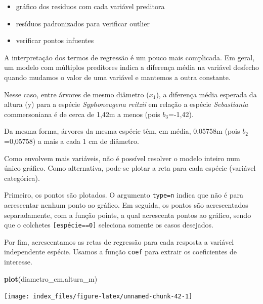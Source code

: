\documentclass[12pt,brazil,oneside]{book}
\newenvironment{Shaded}{\begin{snugshade}}{\end{snugshade}}
\newcommand{\KeywordTok}[1]{\textcolor[rgb]{0.13,0.29,0.53}{\textbf{#1}}}
\newcommand{\NormalTok}[1]{#1}
\providecommand{\tightlist}{%
  \setlength{\itemsep}{0pt}\setlength{\parskip}{0pt}}
\begin{document}
\begin{itemize}
\tightlist
\item
  gráfico dos resíduos com cada variável preditora
\item
  resíduos padronizados para verificar outlier
\item
  verificar pontos infuentes
\end{itemize}

A interpretação dos termos de regressão é um pouco mais complicada. Em geral, um modelo com múltiplos preditores indica a diferença média na variável desfecho quando mudamos o valor de uma variável e mantemos a outra constante.

Nesse caso, entre árvores de mesmo diâmetro (\(x_1\)), a diferença média esperada da altura (y) para a espécie \emph{Syphoneugena reitzii} em relação a espécie \emph{Sebastiania} commersoniana é de cerca de 1,42m a menos (pois \(b_3\)=-1,42).

Da mesma forma, árvores da mesma espécie têm, em média, 0,05758m (pois \(b_2\)=0,05758) a mais a cada 1 cm de diâmetro.

Como envolvem mais variáveis, não é possível resolver o modelo inteiro num único gráfico. Como alternativa, pode-se plotar a reta para cada espécie (variável categórica).

Primeiro, os pontos são plotados. O argumento \texttt{type=\textquotesingle{}n\textquotesingle{}} indica que não é para acrescentar nenhum ponto ao gráfico.
Em seguida, os pontos são acrescentados separadamente, com a função points, a qual acrescenta pontos ao gráfico, sendo que o colchetes \texttt{{[}espécie==0{]}} seleciona somente os casos desejados.

Por fim, acrescentamos as retas de regressão para cada resposta a variável independente espécie. Usamos a função \texttt{coef} para extrair os coeficientes de interesse.

\begin{Shaded}
\begin{Highlighting}[]
\KeywordTok{plot}\NormalTok{(diametro_cm,altura_m)}
\end{Highlighting}
\end{Shaded}

\begin{center}\texttt{[image: index\_files/figure-latex/unnamed-chunk-42-1]} \end{center}
\end{document}
